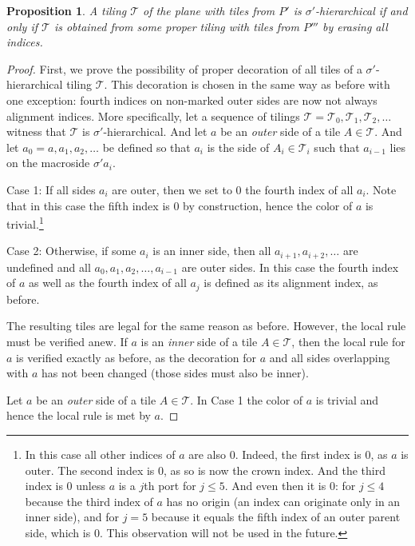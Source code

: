 \documentclass[12pt]{article}
\newtheorem{prop}{Proposition}
\theoremstyle{remark}
\begin{document}
\begin{prop}
A tiling $\mathcal T$ of the plane with tiles from $P'$
is $\sigma'$-hierarchical if and only if
$\mathcal T$ is obtained from some proper tiling 
with tiles from $P'''$ by erasing all indices. 
\end{prop}
\begin{proof}
First, we prove the possibility of proper decoration of all tiles of a $\sigma'$-hierarchical
tiling $\mathcal T$. This decoration is chosen in the same way as before
with one exception: fourth indices on non-marked outer sides are now not
always alignment indices.
More specifically, let a sequence of tilings $\mathcal T=\mathcal T_0,\mathcal T_1,\mathcal T_2,\dots$
witness that $\mathcal T$ is $\sigma'$-hierarchical. And let $a$ be an \emph{outer} side of a tile $A\in \mathcal T$.
And let $a_0=a,a_1,a_2,\dots $ be defined so that  $a_i$ is the side of  $A_i\in \mathcal T_i$ such that
$a_{i-1}$ lies on the macroside $\sigma' a_i$.

Case 1: If all sides $a_i$ are outer, then we set to 0
the fourth index of all $a_i$. Note that in this case the fifth index is 0 
by construction, hence the color of $a$ is trivial.\footnote{In this case
all other indices of $a$ are also 0.
Indeed, the first index is 0, as $a$ is outer. The second index is 0, as so is now the crown index.
And the third index is 0 unless  $a$ is a $j$th port for $j\le 5$. And even then it is 0:
for $j\le4$ because the third index of $a$ has no origin (an index can originate only in an inner side),
and for $j=5$ because it equals the fifth index of an outer parent side, which is 0. This observation
will not be used in the future.} 

Case 2: Otherwise, if some $a_i$ is an inner side, then  all $a_{i+1},a_{i+2},\dots$ are undefined and 
all $a_0,a_1,a_2,\dots,a_{i-1}$
are outer sides. In this case the fourth index of $a$ as well as  the fourth index of 
all $a_j$ is defined as its alignment index, as before. 

The resulting tiles are legal for the same reason as before.
However, the local rule must be verified anew.
If  $a$ is  an \emph{inner} side of a tile $A\in \mathcal T$, then the local rule for $a$
is verified exactly as before, as the decoration for $a$ and all sides overlapping with $a$
has not been changed (those sides must also be inner). 

Let   $a$ be an \emph{outer} side of a tile $A\in \mathcal T$.
In Case 1 the color of $a$ is trivial and hence the local rule is met by $a$.


\end{proof}
\end{document}

